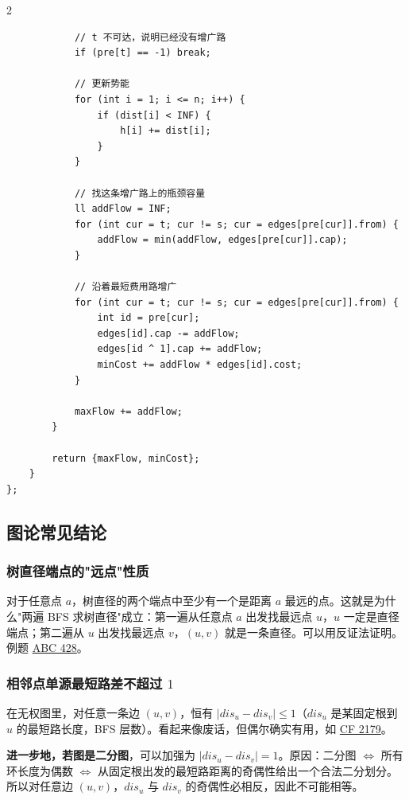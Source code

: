\begin{multicols*}{2}
\begin{verbatim}
            // t 不可达，说明已经没有增广路
            if (pre[t] == -1) break;

            // 更新势能
            for (int i = 1; i <= n; i++) {
                if (dist[i] < INF) {
                    h[i] += dist[i];
                }
            }

            // 找这条增广路上的瓶颈容量
            ll addFlow = INF;
            for (int cur = t; cur != s; cur = edges[pre[cur]].from) {
                addFlow = min(addFlow, edges[pre[cur]].cap);
            }

            // 沿着最短费用路增广
            for (int cur = t; cur != s; cur = edges[pre[cur]].from) {
                int id = pre[cur];
                edges[id].cap -= addFlow;
                edges[id ^ 1].cap += addFlow;
                minCost += addFlow * edges[id].cost;
            }

            maxFlow += addFlow;
        }

        return {maxFlow, minCost};
    }
};
		\end{verbatim}


		\subsection{图论常见结论}

		\subsubsection{树直径端点的"远点"性质}

		对于任意点 $a$，树直径的两个端点中至少有一个是距离 $a$ 最远的点。这就是为什么"两遍 BFS 求树直径"成立：第一遍从任意点 $a$ 出发找最远点 $u$，$u$ 一定是直径端点；第二遍从 $u$ 出发找最远点 $v$，$(u, v)$ 就是一条直径。可以用反证法证明。例题 \href{https://atcoder.jp/contests/abc428/submissions/70535587}{ABC 428}。

		\subsubsection{相邻点单源最短路差不超过 $1$}

		在无权图里，对任意一条边 $(u, v)$，恒有 $|dis_u - dis_v| \leq 1$（$dis_u$ 是某固定根到 $u$ 的最短路长度，BFS 层数）。看起来像废话，但偶尔确实有用，如 \href{https://codeforces.com/contest/2179/submission/355080390}{CF 2179}。

		\textbf{进一步地，若图是二分图}，可以加强为 $|dis_u - dis_v| = 1$。原因：二分图 $\iff$ 所有环长度为偶数 $\iff$ 从固定根出发的最短路距离的奇偶性给出一个合法二分划分。所以对任意边 $(u, v)$，$dis_u$ 与 $dis_v$ 的奇偶性必相反，因此不可能相等。


\end{multicols*}
